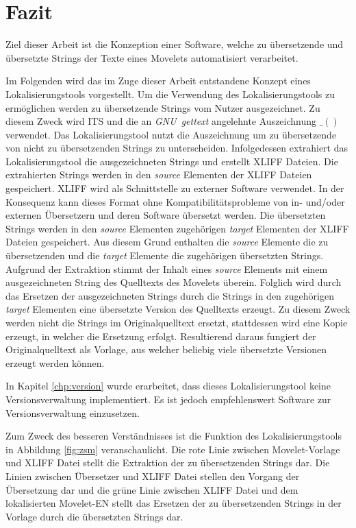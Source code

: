 \chapter{Fazit}
Ziel dieser Arbeit ist die Konzeption einer Software, welche zu übersetzende und übersetzte Strings der Texte eines Movelets automatisiert verarbeitet.
\par
Im Folgenden wird das im Zuge dieser Arbeit entstandene Konzept eines Lokalisierungstools vorgestellt. Um die Verwendung des Lokalisierungstools zu ermöglichen werden zu übersetzende Strings vom Nutzer ausgezeichnet. Zu diesem Zweck wird \ac{ITS} und die an \mbox{\textit{GNU gettext}} angelehnte Auszeichnung $\_()$ verwendet. Das Lokalisierungstool nutzt die Auszeichnung um zu übersetzende von nicht zu übersetzenden Strings zu unterscheiden. Infolgedessen extrahiert das Lokalisierungstool die ausgezeichneten Strings und erstellt \ac{XLIFF} Dateien. Die extrahierten Strings werden in den \mbox{\textit{source}} Elementen der \ac{XLIFF} Dateien gespeichert. \ac{XLIFF} wird als Schnittstelle zu externer Software verwendet.
In der Konsequenz kann dieses Format ohne Kompatibilitätsprobleme von in- und/oder externen Übersetzern und deren Software übersetzt werden. Die übersetzten Strings werden in den \mbox{\textit{source}} Elementen zugehörigen \mbox{\textit{target}} Elementen der \ac{XLIFF} Dateien gespeichert. Aus diesem Grund enthalten die \mbox{\textit{source}} Elemente die zu übersetzenden und die \mbox{\textit{target}} Elemente die zugehörigen übersetzten Strings. Aufgrund der Extraktion stimmt der Inhalt eines \mbox{\textit{source}} Elements mit einem ausgezeichneten String des Quelltexts des Movelets überein. Folglich wird durch das Ersetzen der ausgezeichneten Strings durch die Strings in den zugehörigen \mbox{\textit{target}} Elementen eine übersetzte Version des Quelltexts erzeugt. Zu diesem Zweck werden nicht die Strings im Originalquelltext ersetzt, stattdessen wird eine Kopie erzeugt, in welcher die Ersetzung erfolgt. Resultierend daraus fungiert der Originalquelltext als Vorlage, aus welcher beliebig viele übersetzte Versionen erzeugt werden können. 
\par
In Kapitel \ref{chp:version} wurde erarbeitet, dass dieses Lokalisierungstool keine Versionsverwaltung implementiert. Es ist jedoch empfehlenswert  Software zur Versionsverwaltung einzusetzen.
\par
Zum Zweck des besseren Verständnisses ist die Funktion des Lokalisierungstools in Abbildung \ref{fig:zsm} veranschaulicht. Die rote Linie zwischen Movelet-Vorlage und \ac{XLIFF} Datei stellt die Extraktion der zu übersetzenden Strings dar. Die Linien zwischen Übersetzer und \ac{XLIFF} Datei stellen den Vorgang der Übersetzung dar und die grüne Linie zwischen \ac{XLIFF} Datei und dem lokalisierten Movelet-EN stellt das Ersetzen der zu übersetzenden Strings in der Vorlage durch die übersetzten Strings dar.
